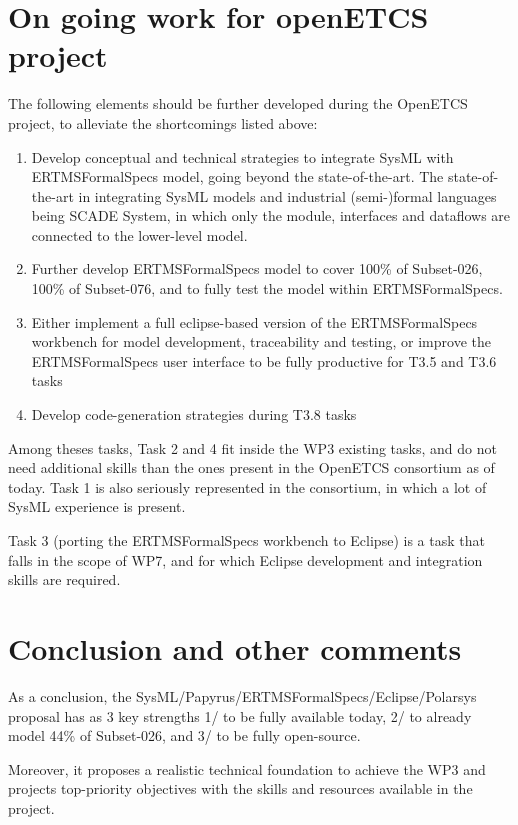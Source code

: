 \section{On going work for openETCS project}

The following elements should be further developed during the OpenETCS project, to alleviate the shortcomings listed above:

\begin{enumerate}
  \item Develop conceptual and technical strategies to integrate SysML with ERTMSFormalSpecs model, going beyond the state-of-the-art. The state-of-the-art in integrating SysML models and industrial (semi-)formal languages being SCADE System, in which only the module, interfaces and dataflows are connected to the lower-level model.
	\item Further develop ERTMSFormalSpecs model to cover 100\% of Subset-026, 100\% of Subset-076, and to fully test the model within ERTMSFormalSpecs. 
	\item Either implement a full eclipse-based version of the ERTMSFormalSpecs workbench for model development, traceability and testing, or improve the ERTMSFormalSpecs user interface to be fully productive for T3.5 and T3.6 tasks
	\item Develop code-generation strategies during T3.8 tasks
\end{enumerate}

Among theses tasks, Task 2 and 4 fit inside the WP3 existing tasks, and do not need additional skills than the ones present in the OpenETCS consortium as of today. Task 1 is also seriously represented in the consortium, in which a lot of SysML experience is present. 

Task 3 (porting the ERTMSFormalSpecs workbench to Eclipse) is a task that falls in the scope of WP7, and for which Eclipse development and integration skills are required.

\section{Conclusion and other comments}

As a conclusion, the SysML/Papyrus/ERTMSFormalSpecs/Eclipse/Polarsys proposal has as 3 key strengths 1/ to be fully available today, 2/ to already model 44\% of Subset-026, and 3/ to be fully open-source. 

Moreover, it proposes a realistic technical foundation to achieve the WP3 and projects top-priority objectives with the skills and resources available in the project.
